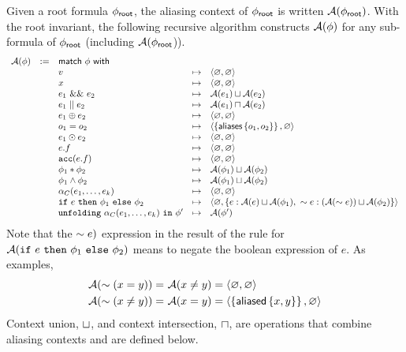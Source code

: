 Given a root formula $\phi_\textsf{root}$, the aliasing context of $\phi_\textsf{root}$ is written $\mathcal{A}(\phi_\textsf{root})$. With the root invariant, the following recursive algorithm constructs $\mathcal{A}(\phi)$ for any sub-formula of $\phi_\textsf{root}$ (including $\mathcal{A}(\phi_\textsf{root}$)).
%
\begin{align*}
\begin{array}{rclcl}
\A(\phi) &:=& \tsf{match} \ \phi \ \tsf{with} \\
&& v &\mt&
  \context{\empty}{\empty}
\\
&& x &\mt&
  \context{\empty}{\empty}
\\
&& e_1 \ \band \ e_2 &\mt&
  \A(e_1) \contextunion \A(e_2)
\\
&& e_1 \bor e_2 &\mt&
  \A(e_1) \contextintersection \A(e_2)
\\
&& e_1 \oplus e_2 &\mt&
  \context{\empty}{\empty}
\\
&& o_1 = o_2 &\mt&
  \context{\set{\aliases\set{o_1, o_2}}}{\empty} %
\\
&& e_1 \odot e_2 &\mt&
  \context{\empty}{\empty}
\\
&& e.f &\mt&
  \context{\empty}{\empty}
\\
&& \cacc(e.f) &\mt&
  \context{\empty}{\empty}
\\
&& \phi_1 \ast \phi_2 &\mt&
  \A(\phi_1) \contextunion \A(\phi_2)
\\
&& \phi_1 \land \phi_2 &\mt&
  \A(\phi_1) \contextunion \A(\phi_2)
\\
&& \alpha_C(e_1, \dots, e_k) &\mt&
  \context{\empty}{\empty}
\\
&& \cif \ e \ \cthen \ \phi_1 \ \celse \ \phi_2 &\mt&
  \context{\empty}{\set{ e : \A(e) \contextunion \A(\phi_1) ,\ \pnot e : (\A(\pnot e)) \contextunion \A(\phi_2) }}
\\
&& \cunfolding \ \alpha_C(e_1, \dots, e_k) \ \cin \ \phi\p &\mt&
  \A(\phi\p)
\end{array}
\end{align*}
%
Note that the $\sim e)$ expression in the result of the rule for $\mathcal{A}(\texttt{if} \ e \ \texttt{then} \ \phi_1 \ \texttt{else} \ \phi_2)$ means to negate the boolean expression of $e$. As examples,
\begin{align*}
  \mathcal{A}( \sim (x =   y) ) = & \ \mathcal{A}(x \neq y) = \langle \varnothing, \varnothing \rangle \\
  \mathcal{A}( \sim (x\neq y) ) = & \ \mathcal{A}(x =    y) = \langle \left\{  \textsf{aliased}\left\{ x,y \right\}  \right\}, \varnothing \rangle
\end{align*}
Context union, $\sqcup$, and context intersection, $\sqcap$, are operations that combine aliasing contexts and are defined below.
